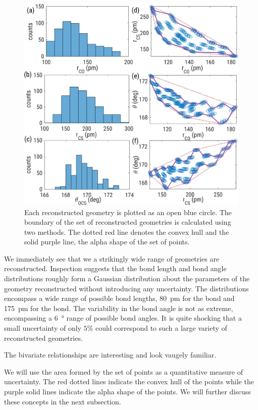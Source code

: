\begin{figure}
  \centering
  \includegraphics[width=\textwidth]{Plots/OCS222Exploration1_5percent}
  \caption[K lol.]
  {Each reconstructed geometry is plotted as an open blue circle. The boundary of the set of reconstructed geometries is calculated using two methods. The dotted red line denotes the convex hull and the solid purple line, the alpha shape of the set of points.}
  \label{fig:OCS222Uncertainty}
\end{figure}

We immediately see that we a strikingly wide range of geometries are reconstructed. Inspection suggests that the bond length and bond angle distributions roughly form a Gaussian distribution about the parameters of the geometry reconstructed without introducing any uncertainty. The distributions encompass a wide range of possible bond lengths, \SI{80}{\pico\m} for the  bond and \SI{175}{\pico\m} for the  bond. The variability in the bond angle is not as extreme, encompassing a \SI{6}{\degree} range of possible bond angles. It is quite shocking that a small uncertainty of only $5\%$ could correspond to such a large variety of reconstructed geometries.

The bivariate relationships are interesting and look vaugely familiar.

We will use the area formed by the set of points as a quantitative measure of uncertainty. The red dotted lines indicate the convex hull of the points while the purple solid lines indicate the alpha shape of the points. We will further discuss these concepts in the next subsection.

